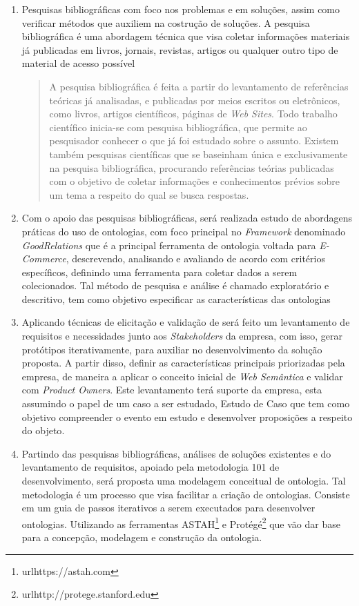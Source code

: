 	\begin{enumerate}
	\item{Pesquisas bibliográficas com foco nos problemas e em soluções, assim como verificar métodos que auxiliem na costrução de soluções. A pesquisa bibliográfica é uma abordagem técnica que visa coletar informações materiais já publicadas em livros, jornais, revistas, artigos ou qualquer outro tipo de material de acesso possível\cite{gil:2008}}

		\begin{quote} A pesquisa bibliográfica é feita a partir do levantamento de referências teóricas já analisadas, e publicadas por meios escritos ou eletrônicos, como livros, artigos científicos, páginas de \textit{Web Sites}. Todo trabalho científico inicia-se com pesquisa 				bibliográfica, que permite ao pesquisador conhecer o que já foi estudado sobre o assunto. Existem também pesquisas científicas que se baseinham única e exclusivamente na pesquisa bibliográfica, procurando referências teórias publicadas com o objetivo de 				coletar informações e conhecimentos prévios sobre um tema a respeito do qual se busca respostas\cite{fonseca:2002}.
		\end{quote}
	\item{Com o apoio das pesquisas bibliográficas, será realizada estudo de abordagens práticas do uso de ontologias, com foco principal no \textit{Framework} denominado \textit{GoodRelations} que é a principal ferramenta de ontologia voltada para \textit{E-Commerce}, descrevendo, analisando e avaliando de acordo com critérios específicos, definindo uma ferramenta para coletar dados a serem colecionados. Tal método de pesquisa e análise é chamado exploratório e descritivo, tem como objetivo especificar as características das ontologias \cite{gil:2008}}
	\item{Aplicando técnicas de elicitação e validação de será feito um levantamento de requisitos e necessidades junto aos \textit{Stakeholders} da empresa, com isso, gerar protótipos iterativamente, para auxiliar no desenvolvimento da solução proposta. A partir disso, definir as características principais priorizadas pela empresa, de maneira a aplicar o conceito inicial de \textit{Web Semântica} e validar com \textit{Product Owners}. Este levantamento terá suporte da empresa, esta assumindo o papel de um caso a ser estudado, Estudo de Caso que tem como objetivo compreender o evento em estudo e desenvolver proposições a respeito do objeto\cite{gil:2008}.}
	\item{Partindo das pesquisas bibliográficas, análises de soluções existentes e do levantamento de requisitos, apoiado pela metodologia 101 de desenvolvimento, será proposta uma modelagem conceitual de ontologia. Tal metodologia é um processo que visa facilitar a criação de ontologias. Consiste em um guia de passos iterativos a serem executados para desenvolver ontologias\cite{rautenberg:2010}. Utilizando as ferramentas ASTAH\footnote{url{https://astah.com}} e Protégé\footnote{url{http://protege.stanford.edu}} que vão dar base para a concepção, modelagem e construção da ontologia.}

\end{enumerate}
